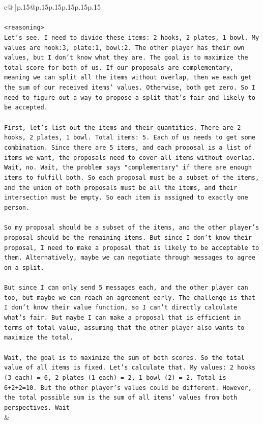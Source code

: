 \documentclass{article}
\begin{document}
{\begin{supertabular}{c@{$\;$}|p{.15\linewidth}@{}p{.15\linewidth}p{.15\linewidth}p{.15\linewidth}p{.15\linewidth}p{.15\linewidth}}
{{{\\ 
\\ 
\texttt{<reasoning>} \\
\texttt{Let's see. I need to divide these items: 2 hooks, 2 plates, 1 bowl. My values are hook:3, plate:1, bowl:2. The other player has their own values, but I don't know what they are. The goal is to maximize the total score for both of us. If our proposals are complementary, meaning we can split all the items without overlap, then we each get the sum of our received items' values. Otherwise, both get zero. So I need to figure out a way to propose a split that's fair and likely to be accepted.} \\
\\ 
\texttt{First, let's list out the items and their quantities. There are 2 hooks, 2 plates, 1 bowl. Total items: 5. Each of us needs to get some combination. Since there are 5 items, and each proposal is a list of items we want, the proposals need to cover all items without overlap. Wait, no. Wait, the problem says "complementary" if there are enough items to fulfill both. So each proposal must be a subset of the items, and the union of both proposals must be all the items, and their intersection must be empty. So each item is assigned to exactly one person.} \\
\\ 
\texttt{So my proposal should be a subset of the items, and the other player's proposal should be the remaining items. But since I don't know their proposal, I need to make a proposal that is likely to be acceptable to them. Alternatively, maybe we can negotiate through messages to agree on a split.} \\
\\ 
\texttt{But since I can only send 5 messages each, and the other player can too, but maybe we can reach an agreement early. The challenge is that I don't know their value function, so I can't directly calculate what's fair. But maybe I can make a proposal that is efficient in terms of total value, assuming that the other player also wants to maximize the total.} \\
\\ 
\texttt{Wait, the goal is to maximize the sum of both scores. So the total value of all items is fixed. Let's calculate that. My values: 2 hooks (3 each) = 6, 2 plates (1 each) = 2, 1 bowl (2) = 2. Total is 6+2+2=10. But the other player's values could be different. However, the total possible sum is the sum of all items' values from both perspectives. Wait} \\
            }
        }
    }
    & \\ \\


\end{supertabular}}
\end{document}
